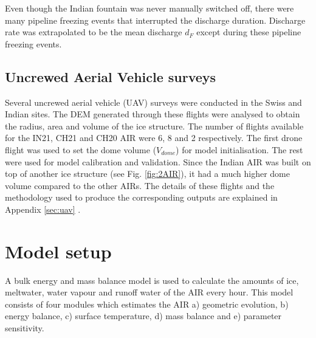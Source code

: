 \documentclass[utf8]{frontiersSCNS} %
\begin{document}
Even though the Indian fountain was never manually switched off, there were many pipeline freezing events that
interrupted the discharge duration. Discharge rate was extrapolated to be the mean discharge $d_F$ except during
these pipeline freezing events.

\subsection{Uncrewed Aerial Vehicle surveys}

Several uncrewed aerial vehicle (UAV) surveys were conducted in the Swiss and Indian sites. The DEM generated
through these flights were analysed to obtain the radius, area and volume of the ice structure. The number of
flights available  for the IN21, CH21 and CH20 AIR were 6, 8 and 2 respectively. The first drone flight was
used to set the dome volume ($V_{dome}$) for model initialisation. The rest were used for model calibration and
validation. Since the Indian AIR was built on top of another ice structure (see Fig. \ref{fig:2AIR}),
it had a much higher dome volume compared to the other AIRs.  The details of these flights and the methodology
used to produce the corresponding outputs are explained in Appendix \ref{sec:uav} .

\section{Model setup}

A bulk energy and mass balance model is used to calculate the amounts of ice, meltwater, water vapour and runoff
water of the AIR every hour. This model consists of four modules which estimates the AIR a) geometric evolution,
b) energy balance, c) surface temperature, d) mass balance and e) parameter sensitivity.
\end{document}
